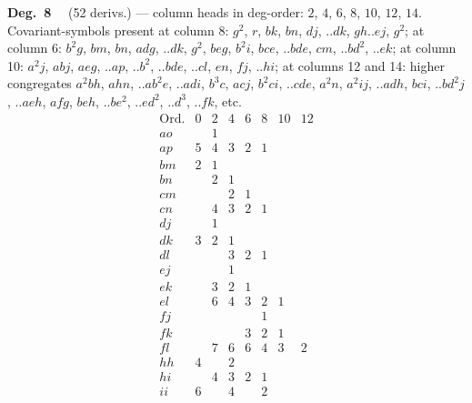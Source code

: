 \documentclass[11pt]{article}
\begin{document}
\noindent\textbf{Deg.~8} \ \ (52 derivs.) --- column heads in deg-order: $2$, $4$, $6$, $8$, $10$, $12$, $14$. \\
Covariant-symbols present at column 8: $g^{2}$, $r$, $bk$, $bn$, $dj$, $..dk$, $gh..ej$, $g^{2}$; at column 6: $b^{2}g$, $bm$, $bn$, $adg$, $..dk$, $g^{2}$, $beg$, $b^{2}i$, $bce$, $.. bde$, $cm$, $.. bd^{2}$, $..ek$; at column 10: $a^{2}j$, $abj$, $aeg$, $..ap$, $..b^{2}$, $..bde$, $..cl$, $en$, $fj$, $..hi$; at columns 12 and 14: higher congregates $a^{2}bh$, $ahn$, $..ab^{2}e$, $..adi$, $b^{3}c$, $acj$, $b^{2}ci$, $..cde$, $a^{2}n$, $a^{2}ij$, $..adh$, $bci$, $..bd^{2}j$, $..aeh$, $afg$, $beh$, $..be^{2}$, $..ed^{2}$, $.. d^{3}$, $..fk$, etc.
\[
\begin{array}{l|ccccccc}
\text{Ord.} & 0 & 2 & 4 & 6 & 8 & 10 & 12 \\\hline
ao & & 1 & & & & & \\
ap & 5 & 4 & 3 & 2 & 1 & & \\
bm & 2 & 1 & & & & & \\
bn & & 2 & 1 & & & & \\
cm & & & 2 & 1 & & & \\
cn & & 4 & 3 & 2 & 1 & & \\
dj & & 1 & & & & & \\
dk & 3 & 2 & 1 & & & & \\
dl & & & 3 & 2 & 1 & & \\
ej & & & 1 & & & & \\
ek & & 3 & 2 & 1 & & & \\
el & & 6 & 4 & 3 & 2 & 1 & \\
fj & & & & & 1 & & \\
fk & & & & 3 & 2 & 1 & \\
fl & & 7 & 6 & 6 & 4 & 3 & 2 \\
hh & 4 & & 2 & & & & \\
hi & & 4 & 3 & 2 & 1 & & \\
ii & 6 & & 4 & & 2 & &
\end{array}
\]

\bigskip
\end{document}
